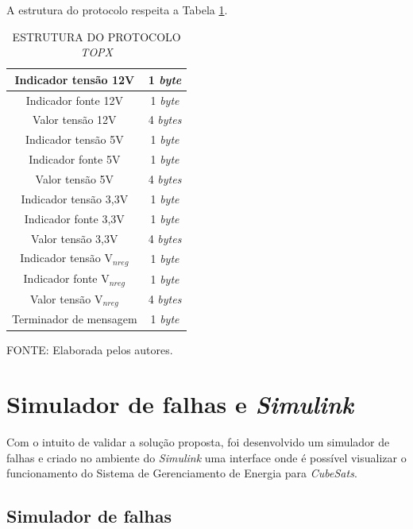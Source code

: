 \documentclass[
	12pt,				%
	openright,			%
	oneside,			%
	a4paper,			%
	english,			%
	french,				%
	spanish,			%
	brazil,				%
	oldfontcommands
	]{abntex2}
\begin{document}
	A estrutura do protocolo respeita a Tabela \ref{Tab_prot}.
	
	\begin{table}[th]
	\caption{ESTRUTURA DO PROTOCOLO \textit{TOPX}}
	\label{Tab_prot}
	\centering
		\begin{tabular}{|c|c|}
			\hline
			Indicador tensão 12V & 1 \textit{byte} \\
			\hline
			Indicador fonte 12V & 1 \textit{byte} \\
			\hline
			Valor tensão 12V & 4 \textit{bytes} \\
			\hline
			Indicador tensão 5V & 1 \textit{byte} \\
			\hline
			Indicador fonte 5V & 1 \textit{byte} \\
			\hline
			Valor tensão 5V & 4 \textit{bytes} \\
			\hline
			Indicador tensão 3,3V & 1 \textit{byte} \\
			\hline
			Indicador fonte 3,3V & 1 \textit{byte} \\
			\hline
			Valor tensão 3,3V & 4 \textit{bytes} \\
			\hline
			Indicador tensão V$ _{nreg} $ & 1 \textit{byte} \\
			\hline
			Indicador fonte V$ _{nreg} $ & 1 \textit{byte} \\
			\hline
			Valor tensão V$ _{nreg} $ & 4 \textit{bytes} \\
			\hline
			Terminador de mensagem & 1 \textit{byte} \\
			\hline
		\end{tabular}	
	
	\begin{small}
	\vspace{3pt}
		FONTE: Elaborada pelos autores.
	\end{small}
	\end{table}

\section[Simulador de falhas e Simulink]{Simulador de falhas e \textit{Simulink}}

	Com o intuito de validar a solução proposta, foi desenvolvido um simulador de falhas e criado no ambiente do \textit{Simulink} uma interface onde é possível visualizar o funcionamento do Sistema de Gerenciamento de Energia para \textit{CubeSats}.
	
\subsection[Simulador de falhas]{Simulador de falhas}
\end{document}
